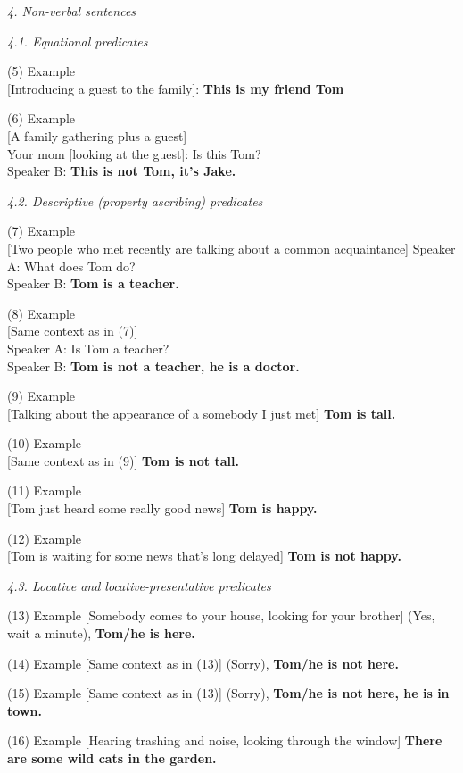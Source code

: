 \documentclass[output=paper,colorlinks,citecolor=brown]{langscibook}
\begin{document}
\begin{paperappendix}
\begin{unindented}
\textit{4. Non-verbal sentences} 

\textit{4.1. Equational predicates}

(5) Example\\
{}[Introducing a guest to the family]: \textbf{This is my friend Tom}

(6) Example\\
{}[A family gathering plus a guest]\\
Your mom [looking at the guest]: Is this Tom?\\
Speaker B: \textbf{This is not Tom, it's Jake.}

\textit{4.2. Descriptive (property ascribing) predicates}

(7) Example\\
{}[Two people who met recently are talking about a common acquaintance]
Speaker A: What does Tom do?\\
Speaker B: \textbf{Tom is a teacher.}

(8) Example\\
{}[Same context as in (7)]\\
Speaker A: Is Tom a teacher?\\
Speaker B: \textbf{Tom is not a teacher, he is a doctor.}

(9) Example\\
{}[Talking about the appearance of a somebody I just met] \textbf{Tom is
tall.}

(10) Example\\
{}[Same context as in (9)] \textbf{Tom is not tall.}

(11) Example\\
{}[Tom just heard some really good news] \textbf{Tom is happy.}

(12) Example\\
{}[Tom is waiting for some news that's long delayed] \textbf{Tom is not
happy.}

\textit{4.3. Locative and locative-presentative predicates} 

(13) Example
{}[Somebody comes to your house, looking for your brother] (Yes, wait a
minute), \textbf{Tom/he is here.}

(14) Example
{}[Same context as in (13)] (Sorry), \textbf{Tom/he is not
here.} 

(15) Example
{}[Same context as in (13)] (Sorry), \textbf{Tom/he is not
here, he is in town.} 

(16) Example
{}[Hearing trashing and noise, looking through the window] \textbf{There
are some wild cats in the garden.} 


\end{unindented}
\end{paperappendix}
\end{document}
